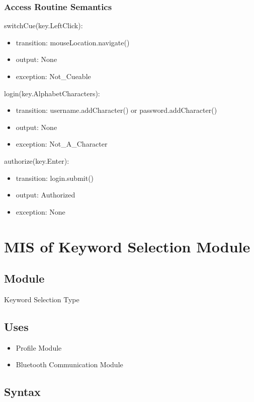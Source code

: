 \documentclass[12pt, titlepage]{article}
\begin{document}
\subsubsection{Access Routine Semantics}

\noindent switchCue(key.LeftClick):
\begin{itemize}
\item transition: mouseLocation.navigate() 
\item output: None
\item exception: Not\_Cueable 
\end{itemize}

\noindent login(key.AlphabetCharacters):
\begin{itemize}
\item transition: username.addCharacter() or password.addCharacter()
\item output: None
\item exception: Not\_A\_Character 
\end{itemize}


\noindent authorize(key.Enter):
\begin{itemize}
\item transition: login.submit() 
\item output: Authorized
\item exception: None 
\end{itemize}

\newpage

\section{MIS of Keyword Selection Module} \label{Module}
\subsection{Module}
Keyword Selection Type

\subsection{Uses}
\begin{itemize}
  \item Profile Module
  \item Bluetooth Communication Module
  \end{itemize}

\subsection{Syntax}
\end{document}
